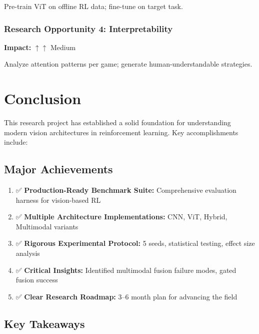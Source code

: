 \documentclass[12pt,a4paper,openany]{report}
\begin{document}
Pre-train ViT on offline RL data; fine-tune on target task.

\subsection{Research Opportunity 4: Interpretability}

\textbf{Impact:} $\uparrow\uparrow$ Medium

Analyze attention patterns per game; generate human-understandable strategies.

\chapter{Conclusion}

This research project has established a solid foundation for understanding modern vision architectures in reinforcement learning. Key accomplishments include:

\section{Major Achievements}

\begin{enumerate}
    \item ✅ \textbf{Production-Ready Benchmark Suite:} Comprehensive evaluation harness for vision-based RL
    \item ✅ \textbf{Multiple Architecture Implementations:} CNN, ViT, Hybrid, Multimodal variants
    \item ✅ \textbf{Rigorous Experimental Protocol:} 5 seeds, statistical testing, effect size analysis
    \item ✅ \textbf{Critical Insights:} Identified multimodal fusion failure modes, gated fusion success
    \item ✅ \textbf{Clear Research Roadmap:} 3--6 month plan for advancing the field
\end{enumerate}

\section{Key Takeaways}
\end{document}
